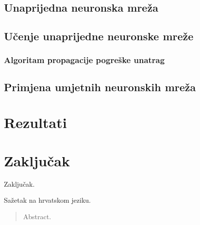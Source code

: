 \documentclass[times, utf8, zavrsni]{fer}
\begin{document}
\section{Unaprijedna neuronska mreža}

\section{Učenje unaprijedne neuronske mreže}

\subsection{Algoritam propagacije pogreške unatrag}

\section{Primjena umjetnih neuronskih mreža}

\chapter{Rezultati}

\chapter{Zaključak}
Zaključak.



\nocite{*}

\begin{sazetak}
Sažetak na hrvatskom jeziku.

\end{sazetak}

\begin{abstract}
Abstract.

\end{abstract}
\end{document}
